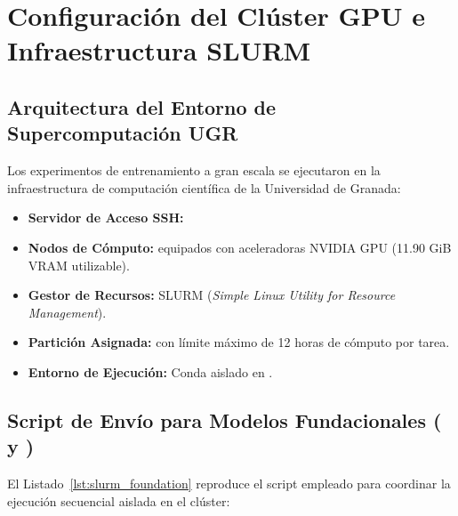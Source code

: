 
\chapter{Configuración del Clúster GPU e Infraestructura SLURM}
\label{ap:slurm_scripts}

\section{Arquitectura del Entorno de Supercomputación UGR}
\label{sec:ap_cluster_arch}

Los experimentos de entrenamiento a gran escala se ejecutaron en la infraestructura de computación científica de la Universidad de Granada:
\begin{itemize}
    \item \textbf{Servidor de Acceso SSH:} 
    \item \textbf{Nodos de Cómputo:}  equipados con aceleradoras NVIDIA GPU (11.90 GiB VRAM utilizable).
    \item \textbf{Gestor de Recursos:} SLURM (\textit{Simple Linux Utility for Resource Management}).
    \item \textbf{Partición Asignada:}  con límite máximo de 12 horas de cómputo por tarea.
    \item \textbf{Entorno de Ejecución:} Conda aislado en .
\end{itemize}

\section{Script de Envío para Modelos Fundacionales (\moment{} y \chronos{})}
\label{sec:ap_slurm_foundation}

El Listado~\ref{lst:slurm_foundation} reproduce el script  empleado para coordinar la ejecución secuencial aislada en el clúster:

